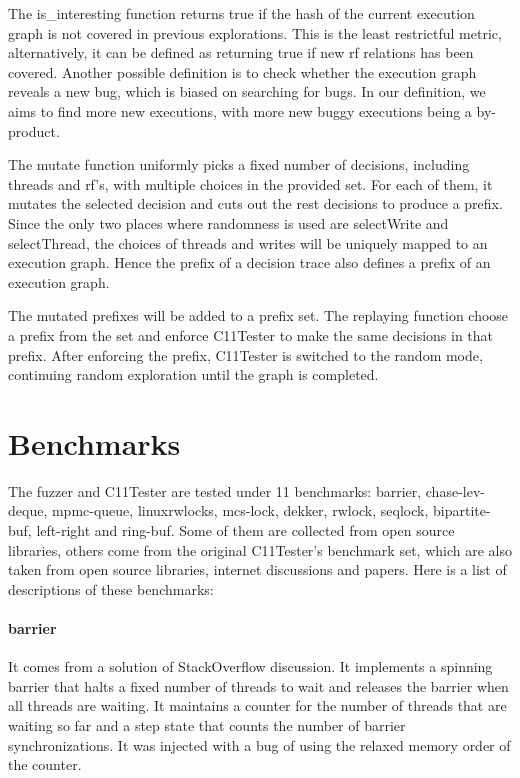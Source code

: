 The is\_interesting function returns true if the hash of the current execution graph is not covered in previous explorations. This is the least restrictful metric, alternatively, it can be defined as returning true if new rf relations has been covered. Another possible definition is to check whether the execution graph reveals a new bug, which is biased on searching for bugs. In our definition, we aims to find more new executions, with more new buggy executions being a by-product.

The mutate function uniformly picks a fixed number of decisions, including threads and rf's, with multiple choices in the provided set. For each of them, it mutates the selected decision and cuts out the rest decisions to produce a prefix. Since the only two places where randomness is used are selectWrite and selectThread, the choices of threads and writes will be uniquely mapped to an execution graph. Hence the prefix of a decision trace also defines a prefix of an execution graph.


The mutated prefixes will be added to a prefix set. The replaying function choose a prefix from the set and enforce C11Tester to make the same decisions in that prefix. After enforcing the prefix,  C11Tester is switched to the random mode, continuing random exploration until the graph is completed.

\section{Benchmarks}

The fuzzer and C11Tester are tested under 11 benchmarks: barrier, chase-lev-deque, mpmc-queue, linuxrwlocks, mcs-lock, dekker, rwlock, seqlock, bipartite-buf, left-right and ring-buf. Some of them are collected from open source libraries, others come from the original C11Tester's benchmark set, which are also taken from open source libraries, internet discussions and papers. Here is a list of descriptions of these benchmarks:

\paragraph{barrier} It comes from a solution of StackOverflow discussion. It implements a spinning barrier that halts a fixed number of threads to wait and releases the barrier when all threads are waiting. It maintains a counter for the number of threads that are waiting so far and a step state that counts the number of barrier synchronizations. It was injected with a bug of using the relaxed memory order of the counter.

